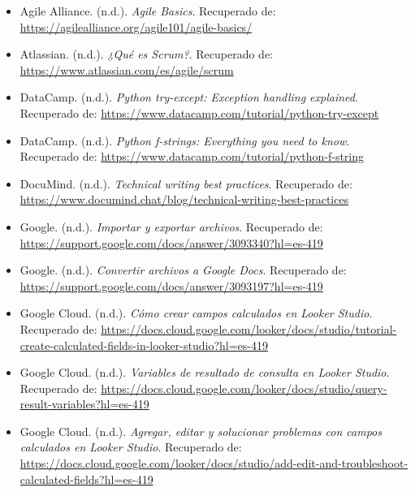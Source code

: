 \documentclass[12pt]{article}
\begin{document}
\begin{itemize}
    
    \item Agile Alliance. (n.d.). \textit{Agile Basics}.  
    Recuperado de: \url{https://agilealliance.org/agile101/agile-basics/}

    \item Atlassian. (n.d.). \textit{¿Qué es Scrum?}.  
    Recuperado de: \url{https://www.atlassian.com/es/agile/scrum}
    
    \item DataCamp. (n.d.). \textit{Python try-except: Exception handling explained}.  
    Recuperado de: \url{https://www.datacamp.com/tutorial/python-try-except}

    \item DataCamp. (n.d.). \textit{Python f-strings: Everything you need to know}.  
    Recuperado de: \url{https://www.datacamp.com/tutorial/python-f-string}

    \item DocuMind. (n.d.). \textit{Technical writing best practices}.  
    Recuperado de: \url{https://www.documind.chat/blog/technical-writing-best-practices}

    \item Google. (n.d.). \textit{Importar y exportar archivos}.  
    Recuperado de: \url{https://support.google.com/docs/answer/3093340?hl=es-419}

    \item Google. (n.d.). \textit{Convertir archivos a Google Docs}.  
    Recuperado de: \url{https://support.google.com/docs/answer/3093197?hl=es-419}

    \item Google Cloud. (n.d.). \textit{Cómo crear campos calculados en Looker Studio}.  
    Recuperado de: \url{https://docs.cloud.google.com/looker/docs/studio/tutorial-create-calculated-fields-in-looker-studio?hl=es-419}

    \item Google Cloud. (n.d.). \textit{Variables de resultado de consulta en Looker Studio}.  
    Recuperado de: \url{https://docs.cloud.google.com/looker/docs/studio/query-result-variables?hl=es-419}

    \item Google Cloud. (n.d.). \textit{Agregar, editar y solucionar problemas con campos calculados en Looker Studio}.  
    Recuperado de: \url{https://docs.cloud.google.com/looker/docs/studio/add-edit-and-troubleshoot-calculated-fields?hl=es-419}


\end{itemize}
\end{document}
